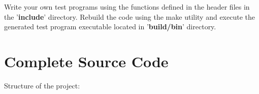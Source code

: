 \documentclass{article}
\begin{document}
\begin{appendices}
\begin{enumerate}
					Write your own test programs using the functions defined in the header files in the '\textbf{include}' directory. Rebuild the code using the make utility and execute the generated test program executable located in '\textbf{build/bin}' directory.
			\end{enumerate}
	
	\pagebreak
		
	\section{Complete Source Code}
	
		Structure of the project:
		
		
		
		
		
		
		
		
		
		
		
		
		
		
		
	
\end{appendices}
		
		
\end{document}
